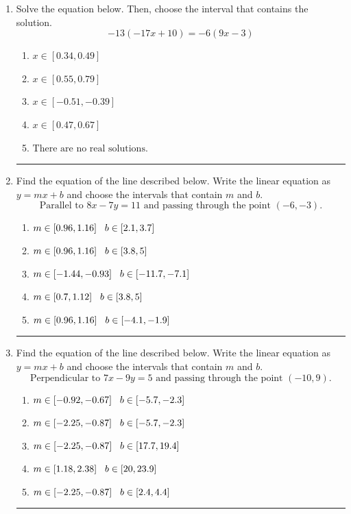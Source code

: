 \documentclass[14pt]{extbook}
\newcommand{\litem}[1]{\item#1\hspace*{-1cm}\rule{\textwidth}{0.4pt}}
\begin{document}
\begin{enumerate}
\litem{
Solve the equation below. Then, choose the interval that contains the solution.\[ -13(-17x + 10) = -6(9x -3) \]\begin{enumerate}[label=\Alph*.]
\item \( x \in [0.34, 0.49] \)
\item \( x \in [0.55, 0.79] \)
\item \( x \in [-0.51, -0.39] \)
\item \( x \in [0.47, 0.67] \)
\item \( \text{There are no real solutions.} \)

\end{enumerate} }
\litem{
Find the equation of the line described below. Write the linear equation as $ y=mx+b $ and choose the intervals that contain $m$ and $b$.\[ \text{Parallel to } 8 x - 7 y = 11 \text{ and passing through the point } (-6, -3). \]\begin{enumerate}[label=\Alph*.]
\item \( m \in [0.96, 1.16] \hspace*{3mm} b \in [2.1, 3.7] \)
\item \( m \in [0.96, 1.16] \hspace*{3mm} b \in [3.8, 5] \)
\item \( m \in [-1.44, -0.93] \hspace*{3mm} b \in [-11.7, -7.1] \)
\item \( m \in [0.7, 1.12] \hspace*{3mm} b \in [3.8, 5] \)
\item \( m \in [0.96, 1.16] \hspace*{3mm} b \in [-4.1, -1.9] \)

\end{enumerate} }
\litem{
Find the equation of the line described below. Write the linear equation as $ y=mx+b $ and choose the intervals that contain $m$ and $b$.\[ \text{Perpendicular to } 7 x - 9 y = 5 \text{ and passing through the point } (-10, 9). \]\begin{enumerate}[label=\Alph*.]
\item \( m \in [-0.92, -0.67] \hspace*{3mm} b \in [-5.7, -2.3] \)
\item \( m \in [-2.25, -0.87] \hspace*{3mm} b \in [-5.7, -2.3] \)
\item \( m \in [-2.25, -0.87] \hspace*{3mm} b \in [17.7, 19.4] \)
\item \( m \in [1.18, 2.38] \hspace*{3mm} b \in [20, 23.9] \)
\item \( m \in [-2.25, -0.87] \hspace*{3mm} b \in [2.4, 4.4] \)


\end{enumerate}}
\end{enumerate}
\end{document}
